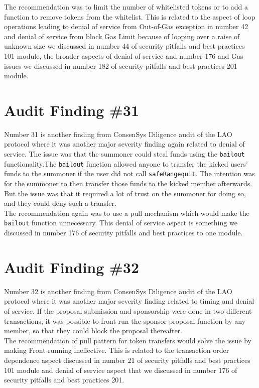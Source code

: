 The recommendation was to limit the number of whitelisted tokens or to add a function to remove tokens from the whitelist. This is related to the aspect of loop operations leading to denial of service from Out-of-Gas exception in number 42 and denial of service from block Gas Limit because of looping over a raise of unknown size we discussed in number 44 of security pitfalls and best practices 101 module, the broader aspects of denial of service and number 176 and Gas issues we discussed in number 182 of security pitfalls and best practices 201 module.

\section{Audit Finding \#31}

Number 31 is another finding from ConsenSys Diligence audit of the LAO protocol where it was another major severity finding again related to denial of service. The issue was that the summoner could steal funds using the \verb|bailout| functionality.The \verb|bailout| function allowed anyone to transfer the kicked users' funds to the summoner if the user did not call \verb|safeRangequit|. The intention was for the summoner to then transfer those funds to the kicked member afterwards. But the issue was that it required a lot of trust on the summoner for doing so, and they could deny such a transfer.\\

The recommendation again was to use a pull mechanism which would make the \verb|bailout| function unnecessary. This denial of service aspect is something we discussed in number 176 of security pitfalls and best practices to one module.

\section{Audit Finding \#32}

Number 32 is another finding from ConsenSys Diligence audit of the LAO protocol where it was another major severity finding related to timing and denial of service. If the proposal submission and sponsorship were done in two different transactions, it was possible to front run the sponsor proposal function by any member, so that they could block the proposal thereafter.\\

The recommendation of pull pattern for token transfers would solve the issue by making Front-running ineffective. This is related to the transaction order dependence aspect discussed in number 21 of security pitfalls and best practices 101 module and denial of service aspect that we discussed in number 176 of security pitfalls and best practices 201.

